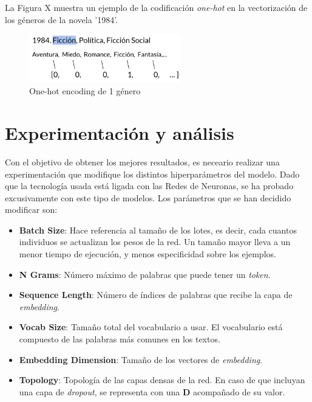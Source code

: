 \documentclass[12pt,a4paper, xcolor=table]{article}
\begin{document}
\vspace{3mm}

La Figura X muestra un ejemplo de la codificación \textit{one-hot} en la vectorización de los géneros de la novela '1984'.

  \begin{figure}[!h]
    \centering
    \includegraphics[width=250px]{img/1984_Genres.png}
    \caption{One-hot encoding de 1 género}
    \end{figure}

\newpage

\section{Experimentación y análisis}

Con el objetivo de obtener los mejores resultados, es neceario realizar una experimentación que modifique los distintos hiperparámetros del modelo. Dado que la tecnología usada está ligada con las Redes de Neuronas, se ha probado excusivamente con este tipo de modelos. Los parámetros que se han decidido modificar son:

\begin{itemize}
  \item \textbf{Batch Size}: Hace referencia al tamaño de los lotes, es decir, cada cuantos individuos se actualizan los pesos de la red. Un tamaño mayor lleva a un menor tiempo de ejecución, y menos especificidad sobre los ejemplos.
  \item \textbf{N Grams}: Número máximo de palabras que puede tener un \textit{token}.
  \item \textbf{Sequence Length}: Número de índices de palabras que recibe la capa de \textit{embedding}.
  \item \textbf{Vocab Size}: Tamaño total del vocabulario a usar. El vocabulario está compuesto de las palabras más comunes en los textos.
  \item \textbf{Embedding Dimension}: Tamaño de los vectores de \textit{embedding}.
  \item \textbf{Topology}: Topología de las capas densas de la red. En caso de que incluyan una capa de \textit{dropout}, se representa con una \textbf{D} acompañado de su valor.
\end{itemize}
\end{document}
